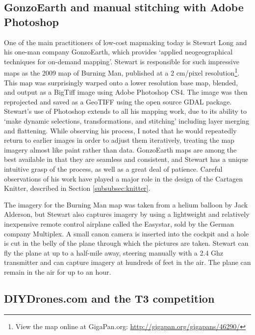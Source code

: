 \documentclass[11pt]{report}
\begin{document}
\subsection{GonzoEarth and manual stitching with Adobe Photoshop}
\label{subsec:gonzoearth}

One of the main practitioners of low-cost mapmaking today is Stewart Long and his one-man company GonzoEarth, which provides `applied neogeographical techniques for on-demand mapping'\cite{long2010process}. Stewart is responsible for such impressive maps as the 2009 map of Burning Man, published at a 2 cm/pixel resolution\footnote{View the map online at GigaPan.org: \url{http://gigapan.org/gigapans/46290/}}. This map was surprisingly warped onto a lower resolution base map, blended, and output as a BigTiff image using Adobe Photoshop CS4. The image was then reprojected and saved as a \ac{GeoTIFF} using the open source GDAL package. Stewart's use of Photoshop extends to all his mapping work, due to its ability to `make dynamic selections, transformations, and stitching' including layer merging and flattening.\cite{long2010process} While observing his process, I noted that he would repeatedly return to earlier images in order to adjust them iteratively, treating the map imagery almost like paint rather than data. GonzoEarth maps are among the best available in that they are seamless and consistent, and Stewart has a unique intuitive grasp of the process, as well as a great deal of patience. Careful observations of his work have played a major role in the design of the Cartagen Knitter, described in Section \ref{subsubsec:knitter}. 

The imagery for the Burning Man map was taken from a helium balloon by Jack Alderson, but Stewart also captures imagery by using a lightweight and relatively inexpensive remote control airplane called the Easystar, sold by the German company Multiplex. A small canon camera is inserted into the cockpit and a hole is cut in the belly of the plane through which the pictures are taken. Stewart can fly the plane at up to a half-mile away, steering manually with a 2.4 Ghz transmitter and can capture imagery at hundreds of feet in the air. The plane can remain in the air for up to an hour.  

\subsection{DIYDrones.com and the T3 competition}
\end{document}
